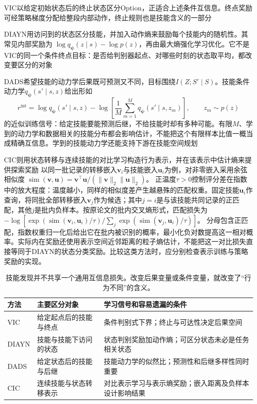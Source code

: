VIC以给定初始状态后的终止状态区分Option，正适合上述条件互信息。终点奖励可经策略梯度分配给整段内部动作，终止规则也是技能含义的一部分

DIAYN用访问到的状态区分技能，并加入动作熵来鼓励每个技能内的随机性。其常见内部奖励为
$\log q_{\bm\psi}(z\mid s)-\log p(z)$，再由最大熵强化学习优化。它不是VIC的同一个条件终点目标：是否给判别器起点、对哪些时刻的状态取平均，都改变要区分的对象

DADS希望技能的动力学后果既可预测又不同，目标围绕$I(Z;S'\mid S)$。技能条件动力学$q_{\bm\psi}(s'\mid s,z)$给出形如
\[
 r^{\mathrm{int}}
   =\log q_{\bm\psi}(s'\mid s,z)
    -\log\left[\frac{1}{M}\sum_{m=1}^{M}
                      q_{\bm\psi}(s'\mid s,z_m)\right],
       \qquad z_m\sim p(z)
\]
的近似训练信号：给定技能要能预测后继，不给技能时却有多种可能。有限$M$、学到的动力学和数据相关的技能分布都会影响估计，不能把这个有限样本比值一概当成精确互信息。学到的技能动力学还能支持下游在技能空间规划

CIC则用状态转移与连续技能的对比学习构造行为表示，并在该表示中估计熵来提供探索奖励
以同一批记录的转移嵌入$\bm v_i$与技能嵌入$\bm u_i$为例，对非零嵌入采用余弦相似度
$\operatorname{sim}(\bm v,\bm u)=
\bm v^\top\bm u/(\lVert\bm v\rVert_2\lVert\bm u\rVert_2)$。
正温度$\tau>0$控制评分差在指数中的放大程度：温度越小，同样的相似度差产生越悬殊的匹配权重。固定技能$\bm u_i$作查询，将同批全部转移嵌入$\bm v_j$作为候选；其中$j=i$是与该技能共同记录的正匹配，其他$j$是批内负样本。按原论文的批内交叉熵形式，匹配损失为
$-\log[\exp(\operatorname{sim}(\bm v_i,\bm u_i)/\tau)/
\sum_j\exp(\operatorname{sim}(\bm v_j,\bm u_i)/\tau)]$。
分母包含正匹配，指数权重归一化后给出它在批内被识别的概率，最小化负对数提高这一相对概率。实际内在奖励还使用表示空间近邻距离的粒子熵估计，不能把这一对比损失直接等同于DIAYN的状态分类奖励。比较这类方法时，应分别检查表示训练与策略奖励的实现。

\begin{table}[t]
  \centering
  \small
  \begin{tabularx}{\linewidth}{>{\raggedright\arraybackslash}p{19mm} >{\raggedright\arraybackslash}X >{\raggedright\arraybackslash}X}
    \toprule
    方法 & 主要区分对象 & 学习信号和容易遗漏的条件 \\
    \midrule
    VIC & 给定起点后的技能与终点 & 条件判别式下界；终止与可达性决定后果空间 \\
    DIAYN & 技能与技能下访问的状态 & 状态判别奖励加动作熵；可区分状态未必是任务相关状态 \\
    DADS & 给定状态后的技能与后继 & 技能动力学的似然比；预测性和后继多样性同时重要 \\
    CIC & 连续技能与状态转移表示 & 对比表示学习与表示熵奖励；嵌入距离及负样本设计影响结果 \\
    \bottomrule
  \end{tabularx}
  \caption{技能发现并不共享一个通用互信息损失。改变后果变量或条件变量，就改变了“行为不同”的含义。}
  \label{tab:rl-learning-skill-objectives}
\end{table}

